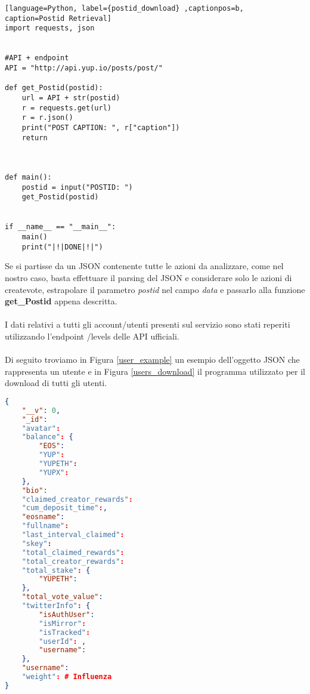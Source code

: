 \begin{lstlisting}[language=Python, label={postid_download} ,captionpos=b, caption=Postid Retrieval]
import requests, json


#API + endpoint
API = "http://api.yup.io/posts/post/"

def get_Postid(postid):
    url = API + str(postid)
    r = requests.get(url)
    r = r.json()
    print("POST CAPTION: ", r["caption"])
    return



def main():
    postid = input("POSTID: ")
    get_Postid(postid)


if __name__ == "__main__":
    main()
    print("|!|DONE|!|")
\end{lstlisting}

Se si partisse da un JSON contenente tutte le azioni da analizzare, come nel nostro caso, basta effettuare il parsing del JSON e considerare solo le azioni di createvote, estrapolare il parametro \textit{postid} nel campo \textit{data} e passarlo alla funzione \textbf{get\_Postid} appena descritta.
\\
\\
I dati relativi a tutti gli account/utenti presenti sul servizio sono stati reperiti utilizzando l'endpoint /levels delle API ufficiali.
\\
\\
Di seguito troviamo in Figura \ref{user_example} un esempio dell'oggetto JSON che rappresenta un utente e in Figura \ref{users_download} il programma utilizzato per il download di tutti gli utenti.

\begin{lstlisting}[language=json, label={user_example}, captionpos=b, caption=User JSON object]
{
    "__v": 0,
    "_id": 
    "avatar": 
    "balance": {
        "EOS": 
        "YUP": 
        "YUPETH":
        "YUPX":
    },
    "bio": 
    "claimed_creator_rewards": 
    "cum_deposit_time":,
    "eosname": 
    "fullname": 
    "last_interval_claimed": 
    "skey":
    "total_claimed_rewards": 
    "total_creator_rewards":
    "total_stake": {
        "YUPETH": 
    },
    "total_vote_value": 
    "twitterInfo": {
        "isAuthUser": 
        "isMirror": 
        "isTracked": 
        "userId": ,
        "username": 
    },
    "username": 
    "weight": # Influenza
}
\end{lstlisting}

